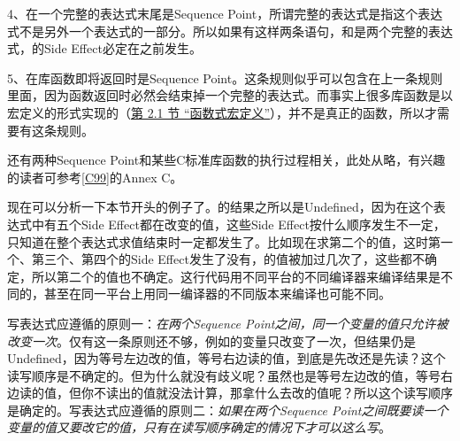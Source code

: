 4、在一个完整的表达式末尾是Sequence Point，所谓完整的表达式是指这个表达式不是另外一个表达式的一部分。所以如果有这样两条语句，和是两个完整的表达式，的Side Effect必定在之前发生。



5、在库函数即将返回时是Sequence Point。这条规则似乎可以包含在上一条规则里面，因为函数返回时必然会结束掉一个完整的表达式。而事实上很多库函数是以宏定义的形式实现的（\hyperlink{db.ch21s02.id2797214}{第 2.\BookSplit{}1 节 “函数式宏定义”}），并不是真正的函数，所以才需要有这条规则。



还有两种Sequence Point和某些C标准库函数的执行过程相关，此处从略，有兴趣的读者可参考\hyperlink{db.bi01.bibli.c99}{[C99]}的Annex C。



现在可以分析一下本节开头的例子了。的结果之所以是Undefined，因为在这个表达式中有五个Side Effect都在改变的值，这些Side Effect按什么顺序发生不一定，只知道在整个表达式求值结束时一定都发生了。比如现在求第二个的值，这时第一个、第三个、第四个的Side Effect发生了没有，的值被加过几次了，这些都不确定，所以第二个的值也不确定。这行代码用不同平台的不同编译器来编译结果是不同的，甚至在同一平台上用同一编译器的不同版本来编译也可能不同。



写表达式应遵循的原则一：\emph{在两个Sequence Point之间，同一个变量的值只允许被改变一次}。仅有这一条原则还不够，例如的变量只改变了一次，但结果仍是Undefined，因为等号左边改的值，等号右边读的值，到底是先改还是先读？这个读写顺序是不确定的。但为什么就没有歧义呢？虽然也是等号左边改的值，等号右边读的值，但你不读出的值就没法计算，那拿什么去改的值呢？所以这个读写顺序是确定的。写表达式应遵循的原则二：\emph{如果在两个Sequence Point之间既要读一个变量的值又要改它的值，只有在读写顺序确定的情况下才可以这么写}。

